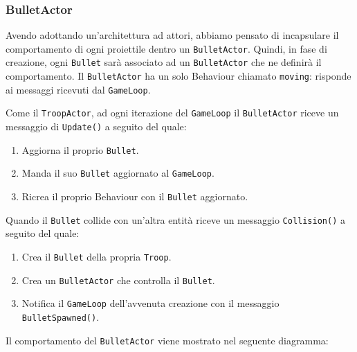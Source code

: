 \subsubsection{BulletActor}
Avendo adottando un'architettura ad attori, abbiamo pensato di incapsulare il comportamento
di ogni proiettile dentro un \texttt{BulletActor}. Quindi, in fase di creazione, ogni \texttt{Bullet} sarà associato ad un
\texttt{BulletActor} che ne definirà il comportamento.
Il \texttt{BulletActor} ha un solo Behaviour chiamato \texttt{moving}: risponde ai messaggi ricevuti dal \texttt{GameLoop}.

Come il \texttt{TroopActor}, ad ogni iterazione del \texttt{GameLoop} il \texttt{BulletActor} riceve un messaggio di \texttt{Update()} a seguito del quale:
\begin{enumerate}
    \item Aggiorna il proprio \texttt{Bullet}.
    \item Manda il suo \texttt{Bullet} aggiornato al \texttt{GameLoop}.
    \item Ricrea il proprio Behaviour con il \texttt{Bullet} aggiornato.
\end{enumerate}
Quando il \texttt{Bullet} collide con un'altra entità riceve un messaggio \texttt{Collision()} a seguito del quale:
\begin{enumerate}
    \item Crea il \texttt{Bullet} della propria \texttt{Troop}.
    \item Crea un \texttt{BulletActor} che controlla il \texttt{Bullet}.
    \item Notifica il \texttt{GameLoop} dell'avvenuta creazione con il messaggio \texttt{BulletSpawned()}.
\end{enumerate}
\newpage
Il comportamento del \texttt{BulletActor} viene mostrato nel seguente diagramma:
